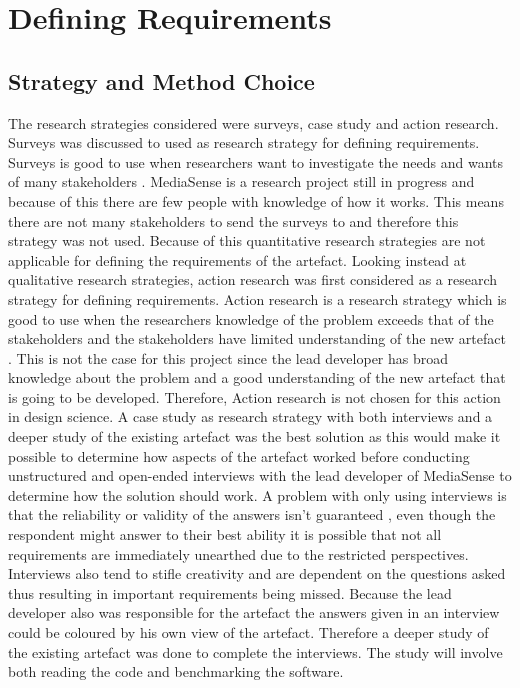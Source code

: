 \section{Defining Requirements}
\subsection{Strategy and Method Choice}
The research strategies considered were surveys, case study and action research. Surveys was discussed to used as research strategy for defining requirements. Surveys is good to use when researchers want to investigate the needs and wants of many stakeholders \cite{johannesson2012design}. MediaSense is a research project still in progress and because of this there are few people with knowledge of how it works. This means there are not many stakeholders to send the surveys to and therefore this strategy was not used. Because of this quantitative research strategies are not applicable for defining the requirements of the artefact. 
Looking instead at qualitative research strategies, action research was first considered as a research strategy for defining requirements. Action research is a research strategy which is good to use when the researchers knowledge of the problem exceeds that of the stakeholders and the stakeholders have limited understanding of the new artefact \cite{johannesson2012design}. This is not the case for this project since the lead developer has broad knowledge about the problem and a good understanding of the new artefact that is going to be developed. Therefore, Action research is not chosen for this action in design science. 
A case study as research strategy with both interviews and a deeper study of the existing artefact was the best solution as this would make it possible to determine how aspects of the artefact worked before conducting unstructured and open-ended interviews with the lead developer of MediaSense to determine how the solution should work. A problem with only using interviews is that the reliability or validity of the answers isn't guaranteed \cite{golafshani2003understanding}, even though the respondent might answer to their best ability it is possible that not all requirements are immediately unearthed due to the restricted perspectives. Interviews also tend to stifle creativity and are dependent on the questions asked \cite{johannesson2012design} thus resulting in important requirements being missed. Because the lead developer also was responsible for the artefact the answers given in an interview could be coloured by his own view of the artefact. Therefore a deeper study of the existing artefact was done to complete the interviews. The study will involve both reading the code and benchmarking the software.

